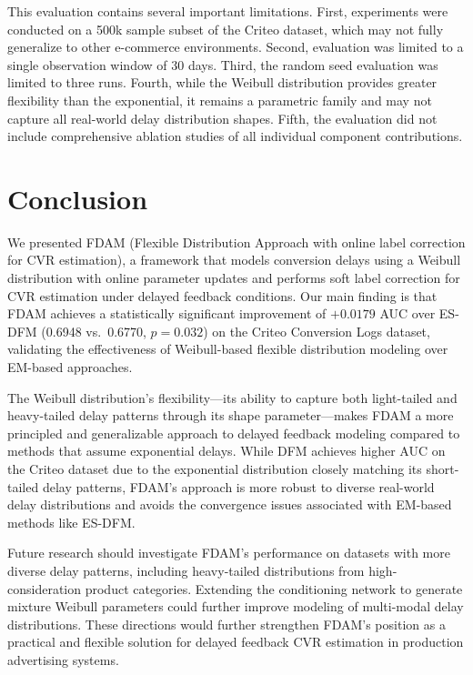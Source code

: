 \documentclass{article}
\begin{document}
This evaluation contains several important limitations. First, experiments were conducted on a 500k sample subset of the Criteo dataset, which may not fully generalize to other e-commerce environments. Second, evaluation was limited to a single observation window of 30 days. Third, the random seed evaluation was limited to three runs. Fourth, while the Weibull distribution provides greater flexibility than the exponential, it remains a parametric family and may not capture all real-world delay distribution shapes. Fifth, the evaluation did not include comprehensive ablation studies of all individual component contributions.

\section{Conclusion}

We presented FDAM (Flexible Distribution Approach with online label correction for CVR estimation), a framework that models conversion delays using a Weibull distribution with online parameter updates and performs soft label correction for CVR estimation under delayed feedback conditions. Our main finding is that FDAM achieves a statistically significant improvement of $+0.0179$ AUC over ES-DFM (0.6948 vs.\ 0.6770, $p=0.032$) on the Criteo Conversion Logs dataset, validating the effectiveness of Weibull-based flexible distribution modeling over EM-based approaches.

The Weibull distribution's flexibility---its ability to capture both light-tailed and heavy-tailed delay patterns through its shape parameter---makes FDAM a more principled and generalizable approach to delayed feedback modeling compared to methods that assume exponential delays. While DFM achieves higher AUC on the Criteo dataset due to the exponential distribution closely matching its short-tailed delay patterns, FDAM's approach is more robust to diverse real-world delay distributions and avoids the convergence issues associated with EM-based methods like ES-DFM.

Future research should investigate FDAM's performance on datasets with more diverse delay patterns, including heavy-tailed distributions from high-consideration product categories. Extending the conditioning network to generate mixture Weibull parameters could further improve modeling of multi-modal delay distributions. These directions would further strengthen FDAM's position as a practical and flexible solution for delayed feedback CVR estimation in production advertising systems.
\end{document}
